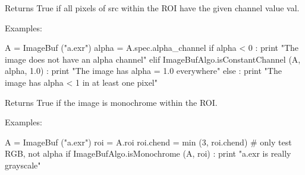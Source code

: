 Returns {\cf True} if all pixels of {\cf src} within the ROI have the
given {\cf channel} value {\cf val}.

\smallskip
\noindent Examples:
\begin{code}
    A = ImageBuf ("a.exr")
    alpha = A.spec.alpha_channel
    if alpha < 0 :
        print "The image does not have an alpha channel"
    elif ImageBufAlgo.isConstantChannel (A, alpha, 1.0) :
        print "The image has alpha = 1.0 everywhere"
    else :
        print "The image has alpha < 1 in at least one pixel"
\end{code}
\apiend


 

Returns {\cf True} if the image is monochrome within the ROI.

\smallskip
\noindent Examples:
\begin{code}
    A = ImageBuf ("a.exr")
    roi = A.roi
    roi.chend = min (3, roi.chend)  # only test RGB, not alpha
    if ImageBufAlgo.isMonochrome (A, roi) :
        print "a.exr is really grayscale"
\end{code}
\apiend



